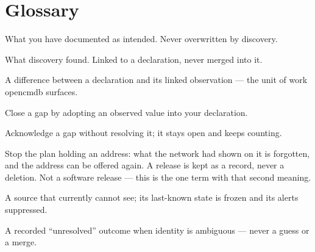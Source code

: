 \documentclass[11pt,oneside,listof=totoc,bibliography=totoc]{scrreprt}
\begin{document}
\appendix
\chapter{Glossary}
\begin{description}[style=nextline,leftmargin=0pt]
  \item[Declared record] What you have documented as intended. Never overwritten by
        discovery.
  \item[Observed record] What discovery found. Linked to a declaration, never merged into it.
  \item[Gap] A difference between a declaration and its linked observation — the unit of
        work opencmdb surfaces.
  \item[Document] Close a gap by adopting an observed value into your declaration.
  \item[Accept-gap] Acknowledge a gap without resolving it; it stays open and keeps counting.
  \item[Release] Stop the plan holding an address: what the network had shown on it is forgotten,
        and the address can be offered again. A release is kept as a record, never a
        deletion. Not a software release --- this is the one term with that second meaning.
  \item[Blind source] A source that currently cannot see; its last-known state is frozen and
        its alerts suppressed.
  \item[Abstention] A recorded ``unresolved'' outcome when identity is ambiguous — never a
        guess or a merge.
\end{description}
\end{document}

